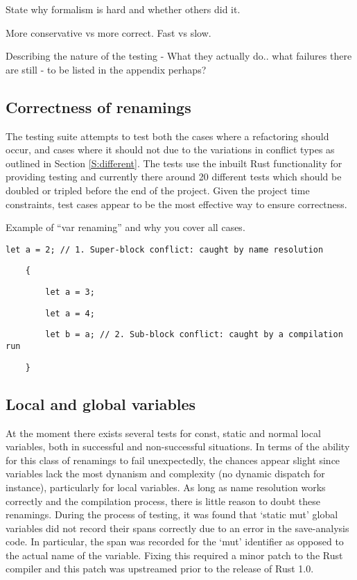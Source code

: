 State why formalism is hard and whether others did it.

More conservative vs more correct. Fast vs slow.

Describing the nature of the testing - What they actually do.. what failures there are still - to be listed in the appendix perhaps?


\subsection{Correctness of renamings}
The testing suite attempts to test both the cases where a refactoring should occur, and cases where it should not due to the variations in conflict types as outlined in Section \ref{S:different}. The tests use the inbuilt Rust functionality for providing testing and currently there around 20 different tests which should be doubled or tripled before the end of the project. Given the project time constraints, test cases appear to be the most effective way to ensure correctness. 


Example of “var renaming” and why you cover all cases.
\begin{fig}
{\verb|let a = 2; // 1. Super-block conflict: caught by name resolution|}

{\verb|    {|}

{\verb|        let |}{\color{red}\verb|a|}{\verb| = 3;|}

{\verb|        let a = 4;|}

{\verb|        let b = |}{\color{red}\verb|a|}{\verb|; // 2. Sub-block conflict: caught by a compilation run|}

{\verb|    }|}
\caption{Examining a tentative rename in red}
\label{Fig:walk}
\end{fig}

\subsection{Local and global variables}
At the moment there exists several tests for const, static and normal local variables, both in successful and non-successful situations. In terms of the ability for this class of renamings to fail unexpectedly, the chances appear slight since variables lack the most dynanism and complexity (no dynamic dispatch for instance), particularly for local variables. As long as name resolution works correctly and the compilation process, there is little reason to doubt these renamings. During the process of testing, it was found that `static mut' global variables did not record their spans correctly due to an error in the save-analysis code. In particular, the span was recorded for the `mut' identifier as opposed to the actual name of the variable. Fixing this required a minor patch to the Rust compiler and this patch was upstreamed prior to the release of Rust 1.0.

